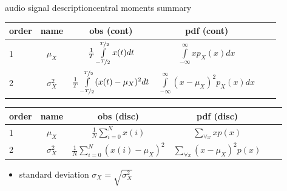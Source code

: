\begin{frame}{audio signal description}{central moments summary}
    \begin{footnotesize}
     \begin{table}
         \centering
             \begin{tabular}{lccccc}
                 order & name & obs (cont) & pdf (cont) & \\\hline
                1 & $\mu_X$ & $\frac{1}{T}\int\limits_{-\nicefrac{T}{2}}^{\nicefrac{T}{2}} x(t)dt$ & $\int\limits_{-\infty}^{\infty}{xp_X(x)dx}$  \\
                2 & $\sigma_X^2$ & $\frac{1}{T}\int\limits_{-\nicefrac{T}{2}}^{\nicefrac{T}{2}}(x(t)-\mu_X)^2dt$ & $\int\limits_{-\infty}^{\infty} (x-\mu_X)^2p_X(x)dx$  \\
             \end{tabular}
     \end{table}
     \begin{table}
         \centering
             \begin{tabular}{lccccc}
                 order & name  & obs (disc) & pdf (disc)\\\hline
                1 & $\mu_X$         &  $\frac{1}{N}\sum\limits_{i=0}^{N} x(i)$              & $\sum\limits_{\forall x} x p(x)$ \\
                2 & $\sigma_X^2$    &  $\frac{1}{N}\sum\limits_{i=0}^{N} (x(i)-\mu_X)^2$    & $\sum\limits_{\forall x} (x-\mu_X)^2p(x)$ \\
             \end{tabular}
     \end{table}
    \end{footnotesize}
    \begin{itemize}
        \item[] standard deviation $\sigma_X = \sqrt{\sigma_X^2}$
    \end{itemize}
\end{frame}		

